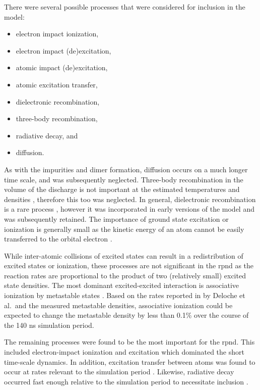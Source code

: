 There were several possible processes that were considered for inclusion in the
model:
\begin{itemize}
  \singlespacing
  \item electron impact ionization,
  \item electron impact (de)excitation,
  \item atomic impact (de)excitation,
  \item atomic excitation transfer,
  \item dielectronic recombination,
  \item three-body recombination,
  \item radiative decay, and
  \item diffusion.
\end{itemize}
As with the impurities and dimer formation, diffusion occurs on a much longer
time scale, and was subsequently neglected. Three-body recombination in the
volume of the discharge is not important at the estimated temperatures and
densities \cite{Lieberman2005}, therefore this too was neglected. In general,
dielectronic recombination is a rare process \cite{Nahar2010}, however it was
incorporated in early versions of the model and was subsequently retained. The
importance of ground state excitation or ionization is generally small as the
kinetic energy of an atom cannot be easily transferred to the orbital electron
\cite{Lieberman2005}.

While inter-atomic collisions of excited states can result in a redistribution
of excited states or ionization, these processes are not significant in the
\acs{rpnd} as the reaction rates are proportional to the product of two
(relatively small) excited state densities. The most dominant excited-excited
interaction is associative ionization by metastable states \cite{Deloche1976}.
Based on the rates reported in by Deloche et al.\ and the measured metastable
densities, associative ionization could be expected to change the metastable
density by less than 0.1\% over the course of the 140 ns simulation period.

The remaining processes were found to be the most important for the \acs{rpnd}.
This included electron-impact ionization and excitation which dominated the
short time-scale dynamics. In addition, excitation transfer between atoms was
found to occur at rates relevant to the simulation period \cite{Lieberman2005}.
Likewise, radiative decay occurred fast enough relative to the simulation period
to necessitate inclusion \cite{Kramida2012}.

